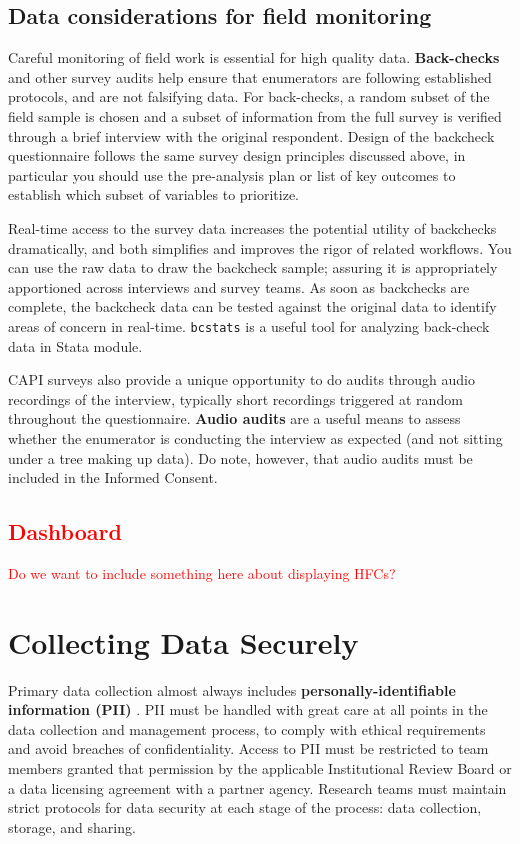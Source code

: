 \subsection{Data considerations for field monitoring}
Careful monitoring of field work is essential for high quality data.
\textbf{Back-checks} and other survey audits help ensure that enumerators are following established protocols, and are not falsifying data.
For back-checks, a random subset of the field sample is chosen and a subset of information from the full survey is verified through a brief interview with the original respondent.
Design of the backcheck questionnaire follows the same survey design principles discussed above, in particular you should use the pre-analysis plan or list of key outcomes to establish which subset of variables to prioritize.

Real-time access to the survey data increases the potential utility of backchecks dramatically, and both simplifies and improves the rigor of related workflows.
You can use the raw data to draw the backcheck sample; assuring it is appropriately apportioned across interviews and survey teams.
As soon as backchecks are complete, the backcheck data can be tested against the original data to identify areas of concern in real-time.
\texttt{bcstats} is a useful tool for analyzing back-check data in Stata module. 

CAPI surveys also provide a unique opportunity to do audits through audio recordings of the interview, typically short recordings triggered at random throughout the questionnaire.
\textbf{Audio audits} are a useful means to assess whether the enumerator is conducting the interview as expected (and not sitting under a tree making up data).
Do note, however, that audio audits must be included in the Informed Consent.

\textcolor{red}{
\subsection{Dashboard}
Do we want to include something here about displaying HFCs? }


\section{Collecting Data Securely}
Primary data collection almost always includes  \textbf{personally-identifiable information (PII)}
.
PII must be handled with great care at all points in the data collection and management process, to comply with ethical requirements and avoid breaches of confidentiality. Access to PII must be restricted to team members granted that permission by the applicable Institutional Review Board or a data licensing agreement with a partner agency. Research teams must maintain strict protocols for data security at each stage of the process: data collection, storage, and sharing.

